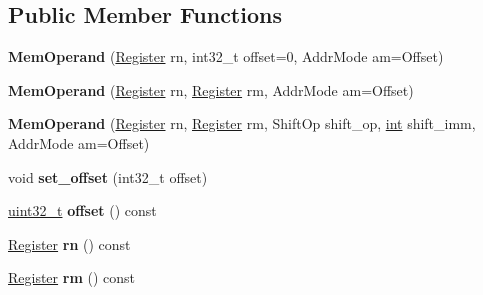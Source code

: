\subsection*{Public Member Functions}
\begin{DoxyCompactItemize}
\item 
\mbox{\label{classv8_1_1internal_1_1MemOperand_a1f1fc1cae4a474495925a17e06e9fac5}} 
{\bfseries Mem\+Operand} (\mbox{\hyperlink{classv8_1_1internal_1_1Register}{Register}} rn, int32\+\_\+t offset=0, Addr\+Mode am=Offset)
\item 
\mbox{\label{classv8_1_1internal_1_1MemOperand_a18e6a1d3aeef9c7bd7d74479c6b8eb7a}} 
{\bfseries Mem\+Operand} (\mbox{\hyperlink{classv8_1_1internal_1_1Register}{Register}} rn, \mbox{\hyperlink{classv8_1_1internal_1_1Register}{Register}} rm, Addr\+Mode am=Offset)
\item 
\mbox{\label{classv8_1_1internal_1_1MemOperand_a8d0dcd20fceec7994a405f7fbbbae791}} 
{\bfseries Mem\+Operand} (\mbox{\hyperlink{classv8_1_1internal_1_1Register}{Register}} rn, \mbox{\hyperlink{classv8_1_1internal_1_1Register}{Register}} rm, Shift\+Op shift\+\_\+op, \mbox{\hyperlink{classint}{int}} shift\+\_\+imm, Addr\+Mode am=Offset)
\item 
\mbox{\label{classv8_1_1internal_1_1MemOperand_a30ece25e1514815c1f3d5777126d312c}} 
void {\bfseries set\+\_\+offset} (int32\+\_\+t offset)
\item 
\mbox{\label{classv8_1_1internal_1_1MemOperand_ab991d0d59cf6cf9854033c505ca77f51}} 
\mbox{\hyperlink{classuint32__t}{uint32\+\_\+t}} {\bfseries offset} () const
\item 
\mbox{\label{classv8_1_1internal_1_1MemOperand_a27806f72f187fecccdc7235eb009172a}} 
\mbox{\hyperlink{classv8_1_1internal_1_1Register}{Register}} {\bfseries rn} () const
\item 
\mbox{\label{classv8_1_1internal_1_1MemOperand_adf280517e8da86a76e84772a44865e82}} 
\mbox{\hyperlink{classv8_1_1internal_1_1Register}{Register}} {\bfseries rm} () const

\end{DoxyCompactItemize}
